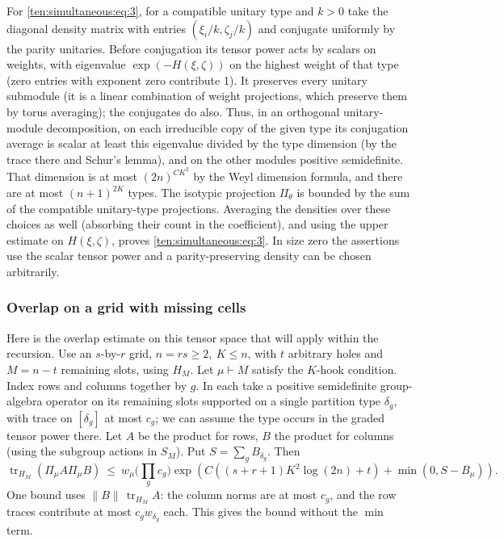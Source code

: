 For \eqref{ten:simultaneous:eq:3}, for a compatible unitary type and \(k>0\) take the diagonal density matrix with entries \((\xi_i/k,\zeta_j/k)\) and conjugate uniformly by the parity unitaries. Before conjugation its tensor power acts by scalars on weights, with eigenvalue \(\exp(-H(\xi,\zeta))\) on the highest weight of that type (zero entries with exponent zero contribute 1). It preserves every unitary submodule (it is a linear combination of weight projections, which preserve them by torus averaging); the conjugates do also. Thus, in an orthogonal unitary-module decomposition, on each irreducible copy of the given type its conjugation average is scalar at least this eigenvalue divided by the type dimension (by the trace there and Schur's lemma), and on the other modules positive semidefinite. That dimension is at most \((2n)^{C K^2}\) by the Weyl dimension formula, and there are at most \((n+1)^{2K}\) types. The isotypic projection \(\Pi_\theta\) is bounded by the sum of the compatible unitary-type projections. Averaging the densities over these choices as well (absorbing their count in the coefficient), and using the upper estimate on \(H(\xi,\zeta)\), proves \eqref{ten:simultaneous:eq:3}. In size zero the assertions use the scalar tensor power and a parity-preserving density can be chosen arbitrarily.

\subsubsection{Overlap on a grid with missing cells}
Here is the overlap estimate on this tensor space that will apply within the recursion. Use an \(s\)-by-\(r\) grid, \(n=rs\ge2,\ K\le n\), with \(t\) arbitrary holes and \(M=n-t\) remaining slots, using \(H_M\). Let \(\mu\vdash M\) satisfy the \(K\)-hook condition. Index rows and columns together by \(g\). In each take a positive semidefinite group-algebra operator on its remaining slots supported on a single partition type \(\delta_g\), with trace on \([\delta_g]\) at most \(c_g\); we can assume the type occurs in the graded tensor power there. Let \(A\) be the product for rows, \(B\) the product for columns (using the subgroup actions in \(S_M\)). Put \(S=\sum_g B_{\delta_g}\). Then
\begin{equation}
 \operatorname{tr}_{H_M}(\Pi_\mu A\Pi_\mu B)
 \ \le\ w_\mu \Big(\prod_g c_g\Big)
 \exp\!\left(C((s+r+1)K^2\log(2n)+t)+\min(0,S-B_\mu)\right).          \label{ten:simultaneous:eq:5}
\end{equation}
One bound uses \(\|B\|\,\operatorname{tr}_{H_M} A\): the column norms are at most \(c_g\), and the row traces contribute at most \(c_g w_{\delta_g}\) each. This gives the bound without the \(\min\) term.

